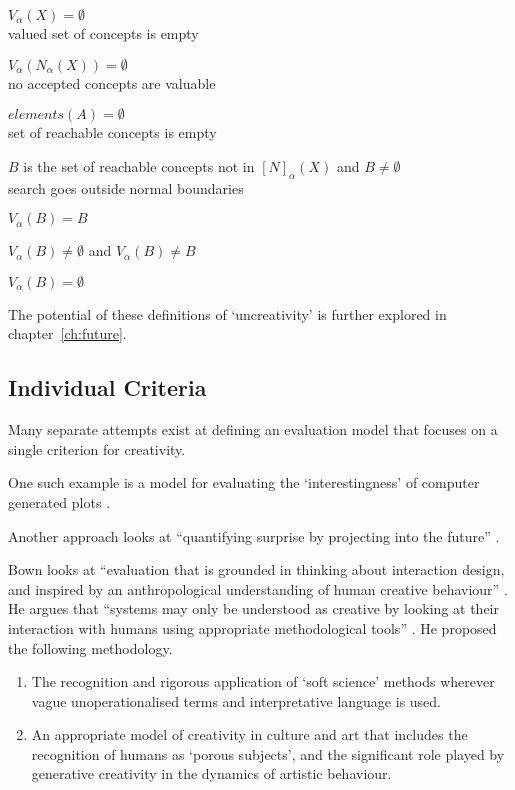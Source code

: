 \begin{description}[leftmargin=10cm]
  \item [Hopeless Uninspiration] $V_\alpha (X) = \emptyset$\\ valued set of concepts is empty
  \item [Conceptual Uninspiration] $V_\alpha (N_\alpha (X)) = \emptyset$\\ no accepted concepts are valuable
  \item [Generative Uninspiration] $elements(A) = \emptyset$\\ set of reachable concepts is empty
  \item [Aberration] $B$ is the set of reachable concepts not in $[N]_\alpha (X)$ and $B \neq \emptyset$\\ search goes outside normal boundaries
  \item [Perfect Aberration] $V_\alpha (B) = B$
  \item [Productive Aberration] $V_\alpha (B) \neq \emptyset$ and $V_\alpha (B) \neq B$
  \item [Pointless Aberration] $V_\alpha (B) = \emptyset$
\end{description}

The potential of these definitions of `uncreativity' is further explored in chapter~\ref{ch:future}.


\subsection{Individual Criteria}
\label{s:indcrit}

Many separate attempts exist at defining an evaluation model that focuses on a single criterion for creativity.

One such example is a model for evaluating the `interestingness' of computer generated plots \autocite{Perez2013}.

Another approach looks at ``quantifying surprise by projecting into the future'' \autocite{Maher2013}.

Bown looks at ``evaluation that is grounded in thinking about interaction design, and inspired by an anthropological understanding of human creative behaviour'' \autocite*{Bown2014}. He argues that ``systems may only be understood as creative by looking at their interaction with humans using appropriate methodological tools'' \autocite*{Bown2014}. He proposed the following methodology.

\begin{enumerate}
  \item The recognition and rigorous application of `soft science' methods wherever vague unoperationalised terms and interpretative language is used.
  \item An appropriate model of creativity in culture and art that includes the recognition of humans as `porous subjects', and the significant role played by generative creativity in the dynamics of artistic behaviour.
\end{enumerate}

